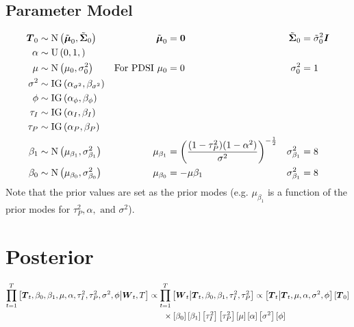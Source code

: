 \documentclass{article}\usepackage[]{graphicx}\usepackage[]{color}
\def\bm#1{\mbox{\boldmath $#1$}}
\begin{document}
\subsection{Parameter Model}
%
\begin{align*}
%
\bm{T}_0 & \sim \mbox{N}\left( \tilde{\bm{\mu}}_0, \tilde{\bm{\Sigma}}_0 \right) & \tilde{\bm{\mu}}_0 & = \bm{0} & \tilde{\bm{\Sigma}}_0 & = \tilde{\sigma}^2_0 \bm{I}\\
%
\alpha & \sim \mbox{U}\left( 0, 1, \right)\\
%
\mu & \sim \mbox{N} \left( \mu_0, \sigma^2_0 \right) & \mbox{For PDSI } \mu_0 & = 0 & \sigma^2_0 & = 1 \\
%
\sigma^2 & \sim \mbox{IG}\left( \alpha_{\sigma^2}, \beta_{\sigma^2} \right)\\
%
\phi & \sim \mbox{IG}\left( \alpha_\phi, \beta_\phi \right)\\
%
\tau_I & \sim \mbox{IG}\left( \alpha_I, \beta_I \right)\\
%
\tau_P & \sim \mbox{IG}\left( \alpha_P, \beta_P \right)\\
%
\beta_1 & \sim \mbox{N} \left( \mu_{\beta_1}, \sigma^2_{\beta_1} \right) & \mu_{\beta_1} & = \left( \frac{(1 - \tau_P^2) (1 - \alpha^2)} {\sigma^2} \right)^{ - \frac{1} {2} } & \sigma^2_{\beta_1} & = 8 \\
%
\beta_0 & \sim \mbox{N} \left( \mu_{\beta_0}, \sigma^2_{\beta_0} \right) & \mu_{\beta_0} & = - \mu \beta_1 & \sigma^2_{\beta_1} & = 8 \\
%
\end{align*}
%
Note that the prior values are set as the prior modes (e.g. $\mu_{\beta_1}$ is a function of the prior modes for $\tau^2_P, \alpha, \mbox{ and } \sigma^2$).
%
%
\section{Posterior}
%
\begin{align*}
%
\prod_{t = 1}^T \left[ \bm{T}_t, \beta_0, \beta_1, \mu, \alpha, \tau^2_I, \tau^2_P, \sigma^2, \phi \middle| \bm{W}_t, T \right] & \propto \prod_{t = 1}^T \left[ \bm{W}_t \middle| \bm{T}_t, \beta_0, \beta_1, \tau^2_I, \tau^2_P \right] \propto \left[ \bm{T}_t \middle| \bm{T}_t, \mu, \alpha, \sigma^2, \phi \right] \left[ \bm{T}_0 \right] \\ 
& \hspace{6mm} \times \left[ \beta_0 \right] \left[ \beta_1 \right] \left[ \tau^2_I \right] \left[ \tau^2_P \right] \left[ \mu \right] \left[ \alpha \right] \left[ \sigma^2 \right] \left[ \phi \right] 
%
\end{align*}
%
%
\end{document}
